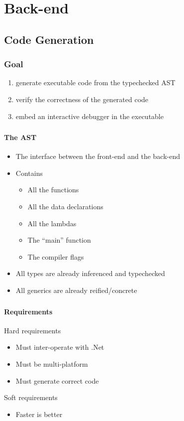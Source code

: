 \section{Back-end}

\subsection{Code Generation}

\begin{frame}
    \frametitle{Goal}
    \begin{enumerate}
    \item generate executable code from the typechecked AST
    \item verify the correctness of the generated code 
    \item embed an interactive debugger in the executable
    \end{enumerate}
\end{frame}

\begin{frame}
    \frametitle{\subsecname}
    \framesubtitle{The AST}
    \begin{itemize}
    \item The interface between the front-end and the back-end
    \item Contains
        \begin{itemize}
        \item All the functions
        \item All the data declarations
        \item All the lambdas
        \item The “main” function
        \item The compiler flags
        \end{itemize}
    \item All types are already inferenced and typechecked
    \item All generics are already reified/concrete
    \end{itemize}
\end{frame}


\begin{frame}
    \frametitle{\subsecname}
    \framesubtitle{Requirements}
    Hard requirements
    \begin{itemize}
    \item Must inter-operate with .Net
    \item Must be multi-platform
    \item Must generate correct code
    \end{itemize}
    Soft requirements
    \begin{itemize}
    \item Faster is better
    \end{itemize}
\end{frame}


